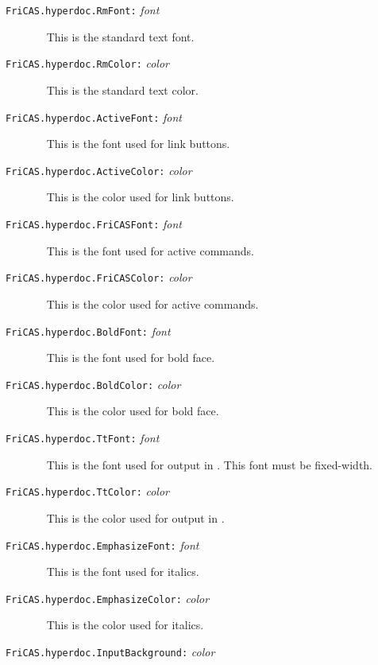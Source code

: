 \begin{description}
\item[{\tt FriCAS.hyperdoc.RmFont:} {\it font}] \ \newline
This is the standard text font.  
\item[{\tt FriCAS.hyperdoc.RmColor:} {\it color}] \ \newline
This is the standard text color.  
\item[{\tt FriCAS.hyperdoc.ActiveFont:} {\it font}] \ \newline
This is the font used for \HyperName{} link buttons.  
\item[{\tt FriCAS.hyperdoc.ActiveColor:} {\it color}] \ \newline
This is the color used for \HyperName{} link buttons.  
\item[{\tt FriCAS.hyperdoc.FriCASFont:} {\it font}] \ \newline
This is the font used for active \Language{} commands.
\item[{\tt FriCAS.hyperdoc.FriCASColor:} {\it color}] \ \newline
This is the color used for active \Language{} commands.
\item[{\tt FriCAS.hyperdoc.BoldFont:} {\it font}] \ \newline
This is the font used for bold face.  
\item[{\tt FriCAS.hyperdoc.BoldColor:} {\it color}] \ \newline
This is the color used for bold face.  
\item[{\tt FriCAS.hyperdoc.TtFont:} {\it font}] \ \newline
This is the font used for \Language{} output in \HyperName{}.
This font must be fixed-width.  
\item[{\tt FriCAS.hyperdoc.TtColor:} {\it color}] \ \newline
This is the color used for \Language{} output in \HyperName{}.
\item[{\tt FriCAS.hyperdoc.EmphasizeFont:} {\it font}] \ \newline
This is the font used for italics.  
\item[{\tt FriCAS.hyperdoc.EmphasizeColor:} {\it color}] \ \newline
This is the color used for italics.  
\item[{\tt FriCAS.hyperdoc.InputBackground:} {\it color}] \ \newline

\end{description}
